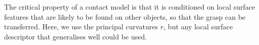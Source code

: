 The critical property of a contact model is that it is conditioned on local surface features that are likely to be found on other objects, so that the grasp can be transferred. Here, we use the principal curvatures $r$, but any local surface descriptor that generalises well could be used. %
%
